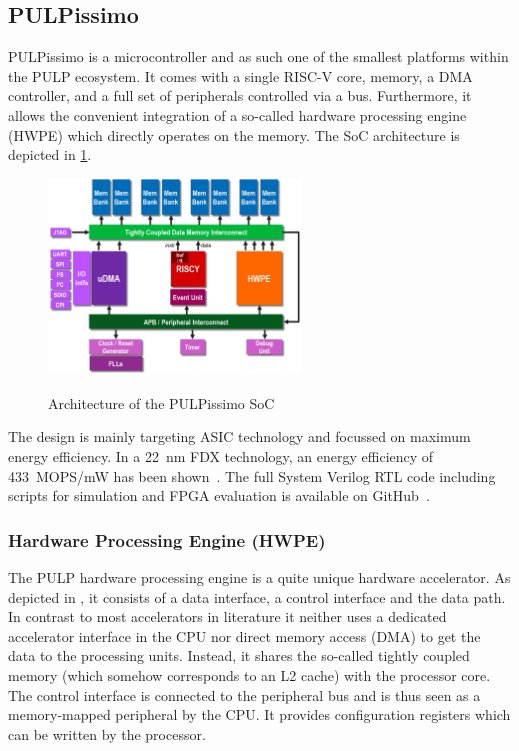\documentclass[a4paper, 12pt]{article}
\begin{document}
\subsection{PULPissimo}

PULPissimo is a microcontroller and as such one of the smallest platforms within the PULP ecosystem. It comes with a single RISC-V core, memory, a DMA controller, and a full set of peripherals controlled via a bus. Furthermore, it allows the convenient integration of a so-called hardware processing engine (HWPE) which directly operates on the memory. The SoC architecture is depicted in \cref{pulpissimo-arch}.

\begin{figure}
	\centering
	\includegraphics[width=0.6\textwidth]{pulpissimo_arch.png}
	\label{pulpissimo-arch}
	\caption{Architecture of the PULPissimo SoC \cite{pulpissimo}}
\end{figure}

The design is mainly targeting ASIC technology and focussed on maximum energy efficiency. In a \SI{22}{nm} FDX technology, an energy efficiency of \SI{433}{MOPS/mW} has been shown~\cite{Schiavone2018}. The full System Verilog RTL code including scripts for simulation and FPGA evaluation is available on GitHub~\cite{pulpissimo}.

\subsubsection*{Hardware Processing Engine (HWPE)}

The PULP hardware processing engine is a quite unique hardware accelerator. As depicted in , it consists of a data interface, a control interface and the data path. In contrast to most accelerators in literature it neither uses a dedicated accelerator interface in the CPU nor direct memory access (DMA) to get the data to the processing units. Instead, it shares the so-called tightly coupled memory (which somehow corresponds to an L2 cache) with the processor core. The control interface is connected to the peripheral bus and is thus seen as a memory-mapped peripheral by the CPU. It provides configuration registers which can be written by the processor.
\end{document}
